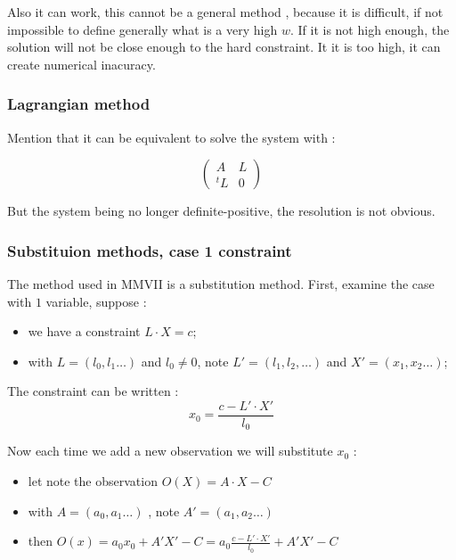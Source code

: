 Also it can work, this cannot be a general method , because
it is difficult, if not impossible to define generally what is a very high $w$.
If it is not high enough, the solution will not be close enough to the hard
constraint.  It it is too high, it can create numerical inacuracy.


\subsubsection{Lagrangian method}

Mention that it can be equivalent to solve the system with :

\begin{equation}
  \begin{pmatrix}
   A & L \\
   ^t L & 0 
  \end{pmatrix}
\end{equation}

But the system being no longer definite-positive, the resolution is not obvious.


\subsubsection{Substituion methods, case 1 constraint}

The method used in MMVII is a substitution method. First, examine the case with $1$ variable, suppose :

\begin{itemize}
    \item we have a constraint $L \cdot X = c$;
    \item with $L= (l_0,l_1 \dots)$ and $l_0 \neq 0$,  note $L'=(l_1,l_2, \dots)$ and $X'=(x_1,x_2\dots)$;
\end{itemize}


The constraint can be written :
\begin{equation}
    x_0 = \frac{c-L' \cdot X'}{l_0} \label{LSQ:SUBST}
\end{equation}

Now  each time we add a new observation we will substitute $x_0$ :

\begin{itemize}
      \item let note the observation  $O(X) = A \cdot X - C$
      \item with $A= (a_0,a_1 \dots)  $  , note  $A' = (a_1,a_2 \dots) $
       \item then   $O(x) = a_0 x_0 + A' X'-C= a_0\frac{c-L' \cdot X'}{l_0} + A'X' -C$
\end{itemize}

